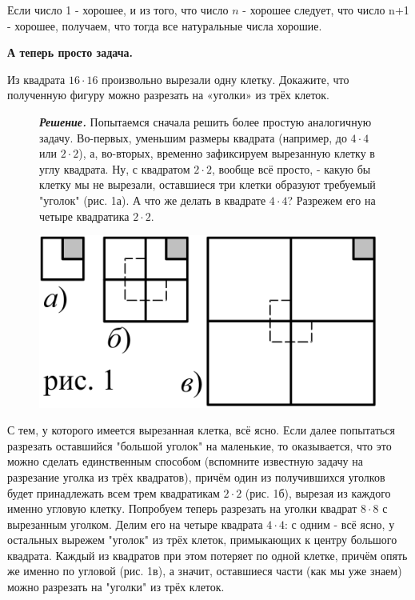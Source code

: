 \begin{samp}
Если число 1 - хорошее, и из того, что число $n$ - хорошее следует, что число n+1 - хорошее, получаем, что тогда все натуральные числа хорошие. \smiley
\end{samp}

\begin{center}
    \textbf{А теперь просто задача.}
\end{center}

\begin{thm} \label{6.0 thm1}
Из квадрата $16 \cdot 16$ произвольно вырезали одну клетку. Докажите, что полученную фигуру можно разрезать на «уголки» из
трёх клеток.
\end{thm}

{\setlength{\intextsep}{2pt}
\begin{figure}[h]
\begin{minipage}{0.72\linewidth}\setlength{\parindent}{1.5em}
\textbf{\textit{Решение.}} Попытаемся сначала решить более простую аналогичную задачу. 
Во-первых, уменьшим размеры квадрата (например, до $4 \cdot 4$ или $2 \cdot 2$), а, во-вторых, временно зафиксируем вырезанную клетку в углу квадрата. Ну, с квадратом $2 \cdot 2$, вообще всё просто, - какую бы клетку мы не вырезали, оставшиеся три клетки образуют требуемый "уголок" (рис. 1а). А что же делать в квадрате $4 \cdot 4$? Разрежем его на четыре квадратика $2 \cdot 2$. 
\end{minipage}
\hfill
\begin{minipage}{0.25\linewidth}
    \includegraphics[scale=0.8]{img/kvadrat1.png}
\end{minipage}
\end{figure}}

С тем, у которого имеется вырезанная клетка, всё ясно. Если далее попытаться разрезать оставшийся "большой уголок" на маленькие, то оказывается, что это можно сделать единственным способом (вспомните известную задачу на разрезание уголка из трёх квадратов), причём один из получившихся уголков будет принадлежать всем трем квадратикам $2 \cdot 2$ (рис. 1б), вырезая из каждого именно
угловую клетку. 
Попробуем теперь разрезать на уголки квадрат $8 \cdot 8$ с вырезанным уголком. Делим его на четыре квадрата $4 \cdot 4$: с одним - всё ясно, у остальных вырежем "уголок" из трёх клеток, примыкающих к центру большого квадрата. Каждый из квадратов при этом потеряет по одной клетке, причём опять же
именно по угловой (рис. 1в), а значит, оставшиеся части (как мы уже знаем) можно разрезать на "уголки" из трёх клеток.

